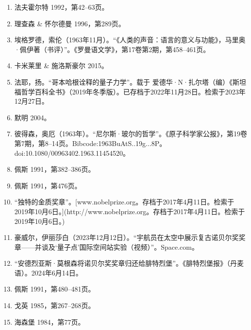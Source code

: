 \begin{enumerate}
\item 法夫霍尔特 1992，第42–63页。
\item 理查森 & 怀尔德曼 1996，第289页。
\item 埃格罗德，索伦（1963年11月）。“《人类的声音：语言的意义与功能》，马里奥·佩伊著（书评）”。《罗曼语文学》，第17卷第2期，第458–461页。
\item 卡米莱里 & 施洛斯豪尔 2015。
\item 法耶，扬。“哥本哈根诠释的量子力学”。载于 爱德华·N·扎尔塔（编）《斯坦福哲学百科全书》（2019年冬季版）。已存档于2022年11月28日。检索于2023年12月27日。
\item 默明 2004。
\item 彼得森，奥厄（1963年）。“尼尔斯·玻尔的哲学”。《原子科学家公报》，第19卷第7期，第8–14页。Bibcode:1963BuAtS..19g...8P。doi:10.1080/00963402.1963.11454520。
\item 佩斯 1991，第382–386页。
\item 佩斯 1991，第476页。
\item “独特的金质奖章”。[www.nobelprize.org。存档于2017年4月11日。检索于2019年10月6日。](http://www.nobelprize.org。存档于2017年4月11日。检索于2019年10月6日。)
\item 豪威尔，伊丽莎白（2023年12月12日）。“宇航员在太空中展示复古诺贝尔奖奖章——并谈及‘量子点’国际空间站实验（视频）”。Space.com。
\item “安德烈亚斯·莫根森将诺贝尔奖奖章归还给腓特烈堡”。《腓特烈堡报》（丹麦语）。2024年6月14日。
\item 佩斯 1991，第480–481页。
\item 戈英 1985，第267–268页。
\item 海森堡 1984，第77页。
\end{enumerate}